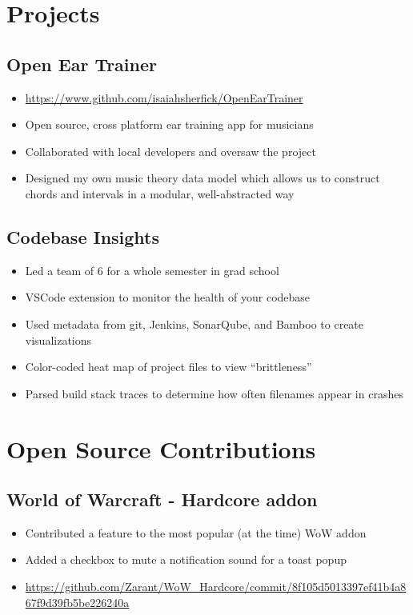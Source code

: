 \documentclass[11pt]{article}
\begin{document}
\section{Projects}
\label{sec:org495d51e}
\subsection{Open Ear Trainer}
\label{sec:org0f45c71}
\begin{itemize}
\item \url{https://www.github.com/isaiahsherfick/OpenEarTrainer}
\item Open source, cross platform ear training app for musicians
\item Collaborated with local developers and oversaw the project
\item Designed my own music theory data model which allows us to construct chords and intervals in a modular, well-abstracted way
\end{itemize}
\subsection{Codebase Insights}
\label{sec:org995f960}
\begin{itemize}
\item Led a team of 6 for a whole semester in grad school
\item VSCode extension to monitor the health of your codebase
\item Used metadata from git, Jenkins, SonarQube, and Bamboo to create visualizations
\item Color-coded heat map of project files to view ``brittleness''
\item Parsed build stack traces to determine how often filenames appear in crashes
\end{itemize}
\section{Open Source Contributions}
\label{sec:orga926993}
\subsection{World of Warcraft - Hardcore addon}
\label{sec:orgac7e02a}
\begin{itemize}
\item Contributed a feature to the most popular (at the time) WoW addon
\item Added a checkbox to mute a notification sound for a toast popup
\item \url{https://github.com/Zarant/WoW\_Hardcore/commit/8f105d5013397ef41b4a867f9d39fb5be226240a}
\end{itemize}
\end{document}
